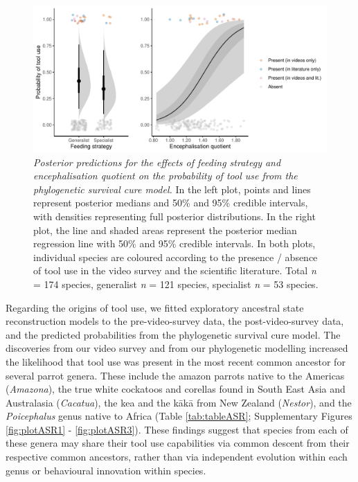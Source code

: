 \documentclass[
  man, donotrepeattitle,floatsintext]{apa6}
\begin{document}
\begin{figure}
\centering
\includegraphics{manuscript_files/figure-latex/plotSurvCure4-1.pdf}
\caption{\label{fig:plotSurvCure4}\emph{Posterior predictions for the effects of feeding
strategy and encephalisation quotient on the probability of tool use from the
phylogenetic survival cure model.} In the left plot, points and lines represent
posterior medians and 50\% and 95\% credible intervals, with densities
representing full posterior distributions. In the right plot, the line and
shaded areas represent the posterior median regression line with 50\% and 95\%
credible intervals. In both plots, individual species are coloured according to
the presence / absence of tool use in the video survey and the scientific
literature. Total \emph{n} = 174 species, generalist \emph{n} =
121 species, specialist \emph{n} =
53 species.}
\end{figure}

Regarding the origins of tool use, we fitted exploratory ancestral state
reconstruction models to the pre-video-survey data, the post-video-survey data,
and the predicted probabilities from the phylogenetic survival cure model. The
discoveries from our video survey and from our phylogenetic modelling increased
the likelihood that tool use was present in the most recent common ancestor for
several parrot genera. These include the amazon parrots native to the Americas
(\emph{Amazona}), the true white cockatoos and corellas found in South East Asia and
Australasia (\emph{Cacatua}), the kea and the kākā from New Zealand (\emph{Nestor}), and
the \emph{Poicephalus} genus native to Africa (Table \ref{tab:tableASR};
Supplementary Figures \ref{fig:plotASR1} - \ref{fig:plotASR3}). These findings
suggest that species from each of these genera may share their tool use
capabilities via common descent from their respective common ancestors, rather
than via independent evolution within each genus or behavioural innovation
within species.
\end{document}
